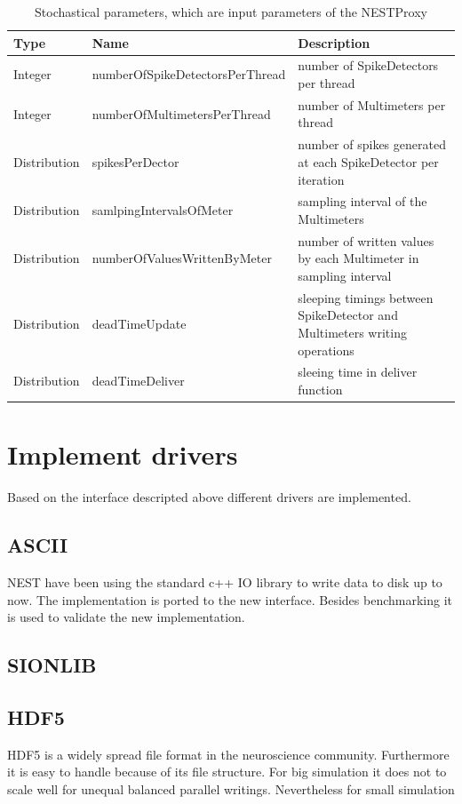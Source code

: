 \documentclass[]{YIC2015}
\begin{document}
\begin{table}[htdp]
\caption{Stochastical parameters, which are input parameters of the NESTProxy}
\centering
\begin{tabular}{lll}
\hline\hline
\textbf{Type} & \textbf{Name} & \textbf{Description} \\ \hline
Integer &   numberOfSpikeDetectorsPerThread & number of SpikeDetectors per thread  \\
Integer &   numberOfMultimetersPerThread & number of Multimeters per thread  \\
Distribution &   spikesPerDector & number of spikes generated at each SpikeDetector per iteration  \\
Distribution &   samlpingIntervalsOfMeter & sampling interval of the Multimeters  \\
Distribution &   numberOfValuesWrittenByMeter & number of written values by each Multimeter in sampling interval  \\
Distribution  &  deadTimeUpdate & sleeping timings between SpikeDetector and Multimeters writing operations \\
Distribution &   deadTimeDeliver & sleeing time in deliver function  \\
\hline\hline
\end{tabular}
\label{tab:table-silva1}
\end{table}


\section{Implement drivers}
Based on the interface descripted above different drivers are implemented.
\subsection{ASCII}
NEST have been using the standard c++ IO library to write data to disk up to now.
The implementation is ported to the new interface.
Besides benchmarking it is used to validate the new implementation.
\subsection{SIONLIB}
\subsection{HDF5}
HDF5 is a widely spread file format in the neuroscience community.
Furthermore it is easy to handle because of its file structure.
For big simulation it does not to scale well for unequal balanced parallel writings.
Nevertheless for small simulation 
\end{document}
